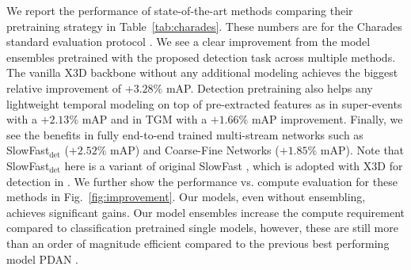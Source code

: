 \documentclass[10pt,twocolumn,letterpaper]{article}
\newcommand{\fref}[1]{Fig.~\ref{#1}}
\newcommand{\tref}[1]{Table~\ref{#1}}
\begin{document}
\begin{table*}[t!]
	
	\vspace{1mm}
	\caption{\textbf{Ablations on Charades} \cite{sigurdsson2016hollywood} \textbf{activity detection}, evaluating our design choices and showing when our detection pretrained models can be most beneficial (i.e., relative improvement from detection pretrained models are not as much as their counterparts at different temporal resolutions (\tref{tab:ablation:downsampling}) or strong temporal aggregation (\tref{tab:ablation:feat-agg})). Here, We show the performance in mean Average Precision (mAP) for fine-grained predictions (i.e., making decisions per every frame rather than evenly-sampled 25 frames from each validation clip). Relative changes of \textcolor{neg}{negative}, \textcolor{smpos}{postive-but-small} and \textcolor{pos}{postive} are shown in corresponding color, whereas the best performances that we highlight are \underline{underlined}. The specific model/models used for evaluation in each table is mentioned at the end of each caption.}
	\label{tab:ablations}
	\vspace{-6mm}
\end{table*}

We report the performance of state-of-the-art methods comparing their pretraining strategy in \tref{tab:charades}. These numbers are for the Charades standard evaluation protocol \cite{sigurdsson2016hollywood}. We see a clear improvement from the model ensembles pretrained with the proposed detection task across multiple methods. The vanilla X3D \cite{feichtenhofer2020x3d} backbone without any additional modeling achieves the biggest relative improvement of $+3.28\%$ mAP. Detection pretraining also helps any lightweight temporal modeling on top of pre-extracted features as in super-events \cite{piergiovanni2018learning} with a $+2.13\%$ mAP and in TGM \cite{piergiovanni2019temporal} with a $+1.66\%$ mAP improvement. Finally, we see the benefits in fully end-to-end trained multi-stream networks such as SlowFast$_\text{det}$ ($+2.52\%$ mAP) and Coarse-Fine Networks \cite{kahatapitiya2021coarse} ($+1.85\%$ mAP). Note that SlowFast$_\text{det}$ here is a variant of original SlowFast \cite{feichtenhofer2019slowfast}, which is adopted with X3D \cite{feichtenhofer2020x3d} for detection in \cite{kahatapitiya2021coarse}. We further show the performance vs. compute evaluation for these methods in \fref{fig:improvement}. Our models, even without ensembling, achieves significant gains. Our model ensembles increase the compute requirement compared to classification pretrained single models, however, these are still more than an order of magnitude efficient compared to the previous best performing model PDAN \cite{dai2021pdan}.
\end{document}
